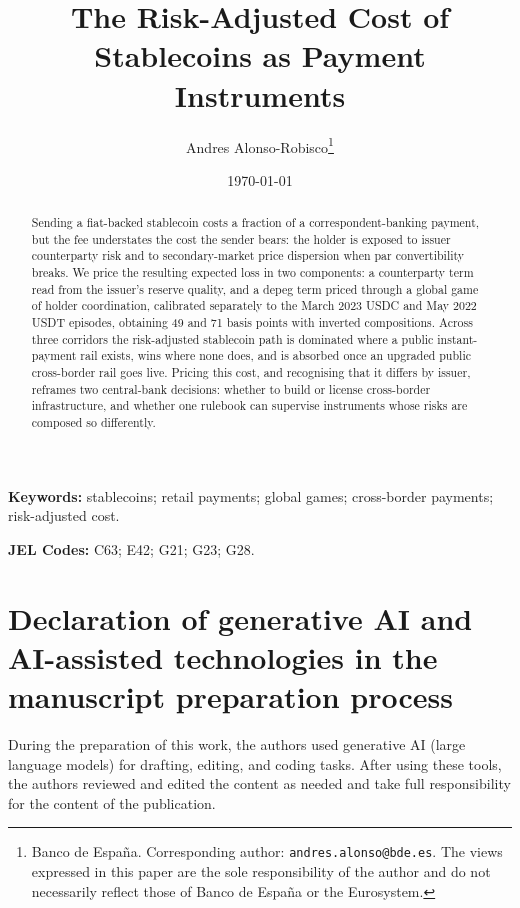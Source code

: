 \documentclass[12pt]{article}
\title{The Risk-Adjusted Cost of Stablecoins as Payment Instruments}
\author{
Andres Alonso-Robisco\thanks{Banco de Espa\~na.
Corresponding author: \texttt{andres.alonso@bde.es}.
The views expressed in this paper are the sole responsibility of the
author and do not necessarily reflect those of Banco de Espa\~na or
the Eurosystem.}
}
\date{\today}
\begin{document}
\maketitle
\doublespacing

\vspace{0.5em}
\begin{abstract}
\noindent Sending a fiat-backed stablecoin costs a fraction of a correspondent-banking payment, but the fee understates the cost the sender bears: the holder is exposed to issuer counterparty risk and to secondary-market price dispersion when par convertibility breaks. We price the resulting expected loss in two components: a counterparty term read from the issuer's reserve quality, and a depeg term priced through a global game of holder coordination, calibrated separately to the March 2023 USDC and May 2022 USDT episodes, obtaining 49 and 71 basis points with inverted compositions. Across three corridors the risk-adjusted stablecoin path is dominated where a public instant-payment rail exists, wins where none does, and is absorbed once an upgraded public cross-border rail goes live. Pricing this cost, and recognising that it differs by issuer, reframes two central-bank decisions: whether to build or license cross-border infrastructure, and whether one rulebook can supervise instruments whose risks are composed so differently.
\end{abstract}

\vspace{2em}

\noindent\textbf{Keywords:} stablecoins; retail payments; global games; cross-border payments; risk-adjusted cost.

\medskip
\noindent\textbf{JEL Codes:} C63; E42; G21; G23; G28.

\clearpage











\clearpage
\section*{Declaration of generative AI and AI-assisted technologies in the manuscript preparation process}

During the preparation of this work, the authors used generative AI (large language models) for drafting, editing, and coding tasks. After using these tools, the authors reviewed and edited the content as needed and take full responsibility for the content of the publication.

\clearpage
\begingroup
\singlespacing


\endgroup

\clearpage
\appendix



\end{document}

